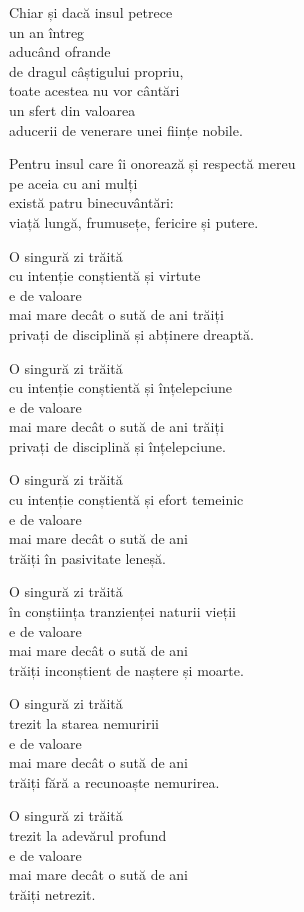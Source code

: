 Chiar și dacă insul petrece\\
un an întreg\\
aducând ofrande\\
de dragul câștigului propriu,\\
toate acestea nu vor cântări\\
un sfert din valoarea\\
aducerii de venerare unei ființe nobile.


Pentru insul care îi onorează și respectă mereu\\
pe aceia cu ani mulți\\
există patru binecuvântări:\\
viață lungă, frumusețe, fericire și putere.


O singură zi trăită\\
cu intenție conștientă și virtute\\
e de valoare\\
mai mare decât o sută de ani trăiți\\
privați de disciplină și abținere dreaptă.


O singură zi trăită\\
cu intenție conștientă și înțelepciune\\
e de valoare\\
mai mare decât o sută de ani trăiți\\
privați de disciplină și înțelepciune.


O singură zi trăită\\
cu intenție conștientă și efort temeinic\\
e de valoare\\
mai mare decât o sută de ani\\
trăiți în pasivitate leneșă.


O singură zi trăită\\
în conștiința tranzienței naturii vieții\\
e de valoare\\
mai mare decât o sută de ani\\
trăiți inconștient de naștere și moarte.


O singură zi trăită\\
trezit la starea nemuririi\\
e de valoare\\
mai mare decât o sută de ani\\
trăiți fără a recunoaște nemurirea.

O singură zi trăită\\
trezit la adevărul profund\\
e de valoare\\
mai mare decât o sută de ani\\
trăiți netrezit.
